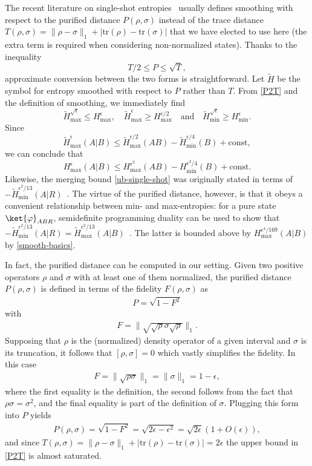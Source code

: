\documentclass[12pt]{article}
\newcommand{\beq}{\begin{eqnarray}}
\newcommand{\eeq}{\end{eqnarray}}
\def\ph{\varphi}
\newcommand{\Hmax}{H_{\max}}
\newcommand{\Hmin}{H_{\min}}
\begin{document}
The recent literature on single-shot entropies~\cite{oneshot,chain,tomamichel2010duality} usually defines smoothing with respect to the purified distance $P(\rho,\sigma)$ instead of the trace distance $T(\rho,\sigma) = \| \rho - \sigma \|_1 + |\text{tr}(\rho) - \text{tr}(\sigma)|$ that we have elected to use here (the extra term is required when considering non-normalized states). Thanks to the inequality~\cite{tomamichel2010duality}
\begin{equation} \label{P2T}
T/2 \leq P \leq \sqrt{T},
\end{equation}
approximate conversion between the two forms is straightforward. Let $\tilde H$ be the symbol for entropy smoothed with respect to $P$ rather than $T$. From \eqref{P2T} and the definition of smoothing, we immediately find
\begin{equation} \label{smooth-basics}
\tilde H_{\max}^{\sqrt{\epsilon}} \leq \Hmax^\epsilon,
\quad
\tilde H_{\max}^{\epsilon} \geq \Hmax^{\epsilon/2}
\quad \text{and} \quad
\tilde H_{\min}^{\sqrt{\epsilon}} \geq \Hmin^\epsilon.
\end{equation}
Since \cite{chain}
\begin{equation}
\tilde H_{\max}^\epsilon(A|B) \leq \tilde H_{\max}^{\epsilon/2}(AB) - \tilde H_{\min}^{\epsilon/4}(B) +\text{const},
\end{equation}
we can conclude that
\begin{equation}
\Hmax^{\epsilon}(A|B) \leq \Hmax^{\epsilon^2}(AB) - \Hmin^{\epsilon^2/4}(B) +\text{const}.
\end{equation}
Likewise, the merging bound \eqref{ub-single-shot} was originally stated in terms of $- \tilde H_{\min}^{\epsilon^2/13}(A|R)$~\cite{oneshot}. The virtue of the purified distance, however, is that it obeys a convenient relationship between min- and max-entropies: for a pure state $\ket{\ph}_{ABR}$, semidefinite programming duality can be used to show that  $-\tilde H_{\min}^{\epsilon^2/13}(A|R) = \tilde H_{\max}^{\epsilon^2/13}(A|B)$~\cite{tomamichel2010duality}. The latter is bounded above by $\Hmax^{\epsilon^4/169}(A|B)$ by \eqref{smooth-basics}.

In fact, the purified distance can be computed in our setting. Given two positive operators $\rho$ and $\sigma$ with at least one of them normalized, the purified distance $P(\rho,\sigma)$ is defined in terms of the fidelity $F(\rho,\sigma)$ as
\beq
P = \sqrt{1-F^2}
\eeq
with
\beq
F = \| \sqrt{\sqrt{\rho}\sigma \sqrt{\rho}}\|_1.
\eeq
Supposing that $\rho$ is the (normalized) density operator of a given interval and $\sigma$ is its truncation, it follows that $[\rho,\sigma]=0$ which vastly simplifies the fidelity. In this case
\beq
F = \| \sqrt{\rho \sigma} \|_1 = \| \sigma \|_1 = 1-\epsilon,
\eeq
where the first equality is the definition, the second follows from the fact that $\rho \sigma = \sigma^2$, and the final equality is part of the definition of $\sigma$. Plugging this form into $P$ yields
\beq
P(\rho,\sigma) = \sqrt{1-F^2} = \sqrt{2 \epsilon - \epsilon^2} = \sqrt{2 \epsilon}(1+ O(\epsilon)),
\eeq
and since $T(\rho,\sigma) = \| \rho - \sigma \|_1 + |\text{tr}(\rho) - \text{tr}(\sigma)| = 2 \epsilon$ the upper bound in \eqref{P2T} is almost saturated.
\end{document}
